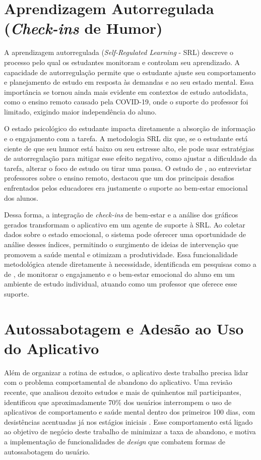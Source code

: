 \section{Aprendizagem Autorregulada (\textit{Check-ins} de Humor)}

A aprendizagem autorregulada (\textit{Self-Regulated Learning} - SRL) descreve o processo pelo qual os estudantes monitoram e controlam seu aprendizado.
A capacidade de autorregulação permite que o estudante ajuste seu comportamento e planejamento de estudo em resposta às demandas e ao seu estado mental.
Essa importância se tornou ainda mais evidente em contextos de estudo autodidata, como o ensino remoto causado pela COVID-19, onde o suporte do professor foi limitado, exigindo maior independência do aluno.

O estado psicológico do estudante impacta diretamente a absorção de informação e o engajamento com a tarefa.
A metodologia SRL diz que, se o estudante está ciente de que seu humor está baixo ou seu estresse alto, ele pode usar estratégias de autorregulação para mitigar esse efeito negativo, como ajustar a dificuldade da tarefa, alterar o foco de estudo ou tirar uma pausa.
O estudo de , ao entrevistar professores sobre o ensino remoto, destacou que um dos principais desafios enfrentados pelos educadores era justamente o suporte ao bem-estar emocional dos alunos.

Dessa forma, a integração de \textit{check-ins} de bem-estar e a análise dos gráficos gerados transformam o aplicativo em um agente de suporte à SRL.
Ao coletar dados sobre o estado emocional, o sistema pode oferecer uma oportunidade de análise desses índices, permitindo o surgimento de ideias de intervenção que promovem a saúde mental e otimizam a produtividade.
Essa funcionalidade metodológica atende diretamente à necessidade, identificada em pesquisas como a de , de monitorar o engajamento e o bem-estar emocional do aluno em um ambiente de estudo individual, atuando como um professor que oferece esse suporte.

\section{Autossabotagem e Adesão ao Uso do Aplicativo}
\label{sec:autossabotagem}

Além de organizar a rotina de estudos, o aplicativo deste trabalho precisa lidar com o problema comportamental de abandono do aplicativo.
Uma revisão recente, que analisou dezoito estudos e mais de quinhentos mil participantes, identificou que aproximadamente 70\% dos usuários interrompem o uso de aplicativos de comportamento e saúde mental dentro dos primeiros 100 dias, com desistências acentuadas já nos estágios iniciais \cite{kidman_2024}.
Esse comportamento está ligado ao objetivo de negócio deste trabalho de minimizar a taxa de abandono, e motiva a implementação de funcionalidades de \textit{design} que combatem formas de autossabotagem do usuário.

